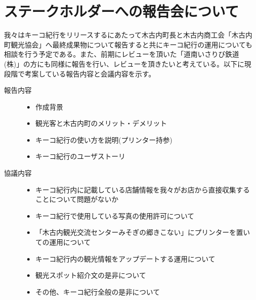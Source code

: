 \section{ステークホルダーへの報告会について}
我々はキーコ紀行をリリースするにあたって木古内町長と木古内商工会「木古内町観光協会」へ最終成果物について報告すると共にキーコ紀行の運用についても相談を行う予定である。また、前期にレビューを頂いた「道南いさりび鉄道(株)」の方にも同様に報告を行い、レビューを頂きたいと考えている。以下に現段階で考案している報告内容と会議内容を示す。
\begin{description}
 \item[報告内容]\mbox{}
 	\begin{itemize}
	\item 作成背景
	\item 観光客と木古内町のメリット・デメリット
	\item キーコ紀行の使い方を説明(プリンター持参)
	\item キーコ紀行のユーザストーリ \\
	\end{itemize}
 \item[協議内容]\mbox{}
	\begin{itemize}
	\item キーコ紀行内に記載している店舗情報を我々がお店から直接収集することについて問題がないか
	\item キーコ紀行で使用している写真の使用許可について
	\item 「木古内観光交流センターみそぎの郷きこない」にプリンターを置いての運用について
	\item キーコ紀行内の観光情報をアップデートする運用について
	\item 観光スポット紹介文の是非について
	\item その他、キーコ紀行全般の是非について
	\end{itemize}
\end{description}

